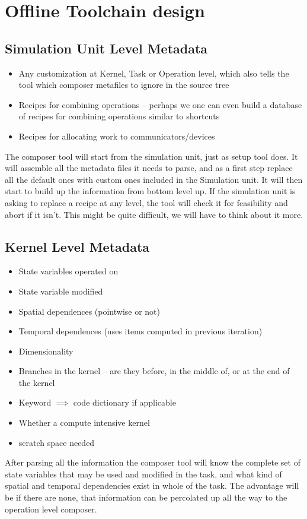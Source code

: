 \documentclass{article}
\begin{document}
\section{Offline Toolchain design}

\subsection{Simulation Unit Level Metadata}
\begin{itemize}
\item Any customization at Kernel, Task or Operation level, which also
  tells the tool which composer metafiles to ignore in the source tree
\item Recipes for combining operations -- perhaps we one can even build a
  database of recipes for combining operations similar to shortcuts
\item Recipes for allocating work to communicators/devices
\end{itemize}
The composer tool will start from the simulation unit, just as setup
tool does. It will assemble all the metadata files it needs to parse,
and as a first step replace all the default ones with custom ones
included in the Simulation unit. It will then start to build up the
information from bottom level up. If the simulation unit is asking to
replace a recipe at any level, the tool will check it for feasibility
and abort if it isn't. This might be quite difficult, we will have to
think about it more. 
 
\subsection{Kernel Level Metadata}
\begin{itemize}
\item State variables operated on
\item State variable modified
\item Spatial dependences (pointwise or not)
\item Temporal dependences (uses items computed in previous
  iteration)
\item Dimensionality
\item Branches in the kernel -- are they before, in the middle of, or
  at the end of the kernel
\item Keyword $\implies$ code dictionary if applicable
\item Whether a compute intensive kernel
\item scratch space needed
\end{itemize}
After parsing all the information the composer tool will know the
complete set of state variables that may be used and modified in the
task, and what kind of spatial and temporal dependencies exist in
whole of the task. The advantage will be if there are none, that
information can be percolated up all the way to the operation level composer.
\end{document}
